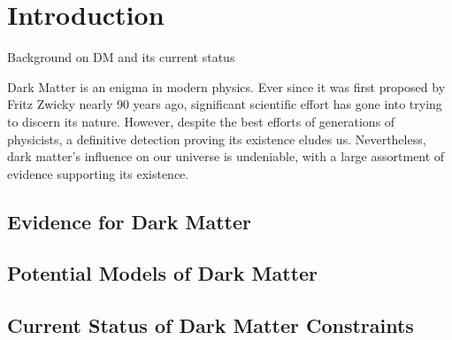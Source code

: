 \graphicspath{{img/chapter_1/}}

\chapter{Introduction}
\label{chapter:introduction}

\begin{synopsis}
  Background on DM and its current status
\end{synopsis}

  Dark Matter is an enigma in modern physics. Ever since it was first 
  proposed by Fritz Zwicky nearly 90 years ago, significant scientific
  effort has gone into trying to discern its nature. However, despite the
  best efforts of generations of physicists, a definitive detection
  proving its existence eludes us. Nevertheless, dark matter's influence 
  on our universe is undeniable, with a large assortment of evidence 
  supporting its existence.

  \section{Evidence for Dark Matter}

  \section{Potential Models of Dark Matter}

  \section{Current Status of Dark Matter Constraints}

